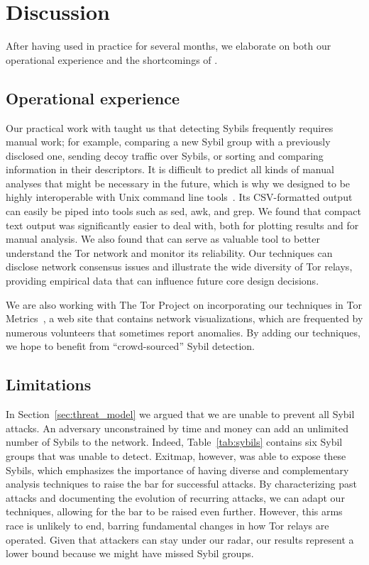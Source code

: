 \section{Discussion}
\label{sec:discussion}
After having used \sys in practice for several months, we elaborate on both our
operational experience and the shortcomings of \sys.

\subsection{Operational experience}
\label{sec:operational}
Our practical work with \sys taught us that detecting Sybils frequently requires
manual work; for example, comparing a new Sybil group with a previously
disclosed one, sending decoy traffic over Sybils, or sorting and comparing
information in their descriptors.  It is difficult to predict all kinds of
manual analyses that might be necessary in the future, which is why we designed
\sys to be highly interoperable with Unix command line tools~\cite{Pike1983a}.
Its CSV-formatted output can easily be piped into tools such as sed, awk, and
grep.  We found that compact text output was significantly easier to deal with,
both for plotting results and for manual analysis.  We also found that \sys can
serve as valuable tool to better understand the Tor network and monitor its
reliability.  Our techniques can disclose network consensus issues and
illustrate the wide diversity of Tor relays, providing empirical data that can
influence future core design decisions.

We are also working with The Tor Project on incorporating our techniques in
Tor Metrics~\cite{metrics}, a web site that contains network visualizations,
which are frequented by numerous volunteers that sometimes report anomalies.
By adding our techniques, we hope to benefit from ``crowd-sourced'' Sybil
detection.

\subsection{Limitations}
\label{sec:limitations}
In Section~\ref{sec:threat_model} we argued that we are unable to prevent all
Sybil attacks.  An adversary unconstrained by time and money can add an
unlimited number of Sybils to the network.  Indeed, Table~\ref{tab:sybils}
contains six Sybil groups that \sys was unable to detect.  Exitmap, however, was
able to expose these Sybils, which emphasizes the importance of having diverse
and complementary analysis techniques to raise the bar for successful attacks.
By characterizing past attacks and documenting the evolution of recurring
attacks, we can adapt our techniques, allowing for the bar to be raised even
further.  However, this arms race is unlikely to end, barring fundamental
changes in how Tor relays are operated.  Given that attackers can stay under our
radar, our results represent a lower bound because we might have missed Sybil
groups.

